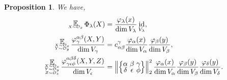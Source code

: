\documentclass[pdflatex, sn-mathphys-num]{sn-jnl} %
\makeatletter
\theoremstyle{plain}
\newtheorem{prop}[thm]{Proposition}
\theoremstyle{definition}
\DeclareMathOperator{\id}{id}
\DeclareMathOperator*{\expect}{\mathbb{E}}
\newcommand{\orbit}{\mathcal O}
\newcommand{\norm}[1]{\left\lVert#1\right\rVert}
\newcommand{\vp}{\varphi} %
\newcommand{\ex}{x}
\newcommand{\ey}{y}
\newcommand{\ez}{z}
\newcommand{\ya}{\alpha}
\newcommand{\yb}{\beta}
\newcommand{\yc}{\gamma}
\newcommand{\yd}{\delta}
\newcommand{\ye}{\epsilon}
\newcommand{\yf}{\phi}
\newcommand{\yx}{\lambda}
\newcommand{\tightcurlysixj}[1]{
\begingroup
\arraycolsep=1.5pt
\renewcommand{\arraystretch}{0.3}
\left\{\!\begin{array}{ccc}
    #1
\end{array}\!\right\}
\endgroup
}
\newcommand{\abcdefsymbol}{\tightcurlysixj{\alpha & \beta & \gamma \\ \delta & \epsilon & \phi}}
\newcommand{\tightsinglesubstack}[2]{
\begingroup
    \renewcommand{\arraystretch}{0.3}
    \begin{array}{c@{}} #1 \\ {\scriptscriptstyle #2} \end{array}
\endgroup
}
\newcommand{\tightdoublesubstack}[3]{
\begingroup
    \renewcommand{\arraystretch}{0.3}
    \begin{array}{c@{}} #1 \\ {\scriptscriptstyle #2} \\ {\scriptscriptstyle #3} \end{array}
\endgroup
}
\newcommand{\tighttriplesubstack}[4]{
\begingroup
    \renewcommand{\arraystretch}{0.3}
    \begin{array}{c@{}} #1 \\ {\scriptscriptstyle #2} \\ {\scriptscriptstyle #3} \\ {\scriptscriptstyle #4} \end{array}
\endgroup
}
\makeatother
\begin{document}
\begin{prop}
    \label{prop:random_matrices}
    We have,
    \begin{align}
        \begin{split}
            \tightsinglesubstack{\expect}{X \sim \orbit_{\ex}}\, \Phi_\yx(X)
            &= \frac{\vp_\yx(x)}{\dim V_\yx}  \id_{V_\yx}, \\
            \tightdoublesubstack{\expect}{X \sim \orbit_{\ex}}{Y \sim \orbit_{\ey}}\,  \frac{\vp^{\ya \yb}_\yc(X, Y)}{\dim V_\yc}
            &= c_{\ya \yb}^\yc \frac{\vp_\ya(x)}{\dim V_\ya}\frac{\vp_\yb(y)}{\dim V_\yb}, \\
            \tighttriplesubstack{\expect}{X \sim \orbit_{\ex}}{Y \sim \orbit_{\ey}}{Z \sim \orbit_{\ez}}\, \frac{\vp^{\ya \yb \yd}_{\yc \ye \yf}(X, Y, Z)}{\dim V_\ye}
            &= \norm{\abcdefsymbol}_2^2 \frac{\vp_\ya(x)}{\dim V_\ya}\frac{\vp_\yb(y)}{\dim V_\yb}
            \frac{\vp_\yd(y)}{\dim V_\yd}.
        \end{split}
    \end{align}
\end{prop}
\end{document}

